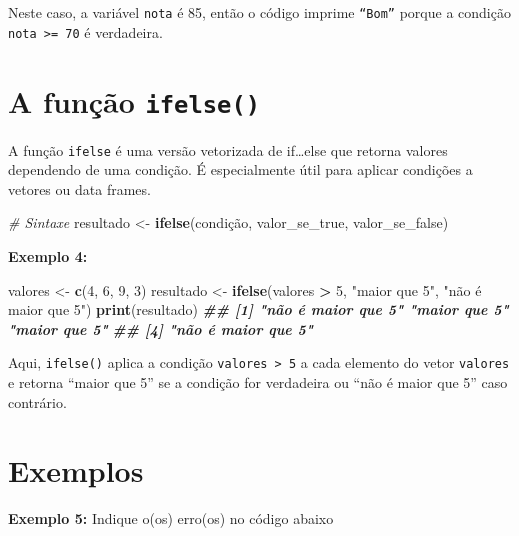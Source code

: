 \documentclass[
]{book}
\newenvironment{Shaded}{\begin{snugshade}}{\end{snugshade}}
\newcommand{\CommentTok}[1]{\textcolor[rgb]{0.56,0.35,0.01}{\textit{#1}}}
\newcommand{\DecValTok}[1]{\textcolor[rgb]{0.00,0.00,0.81}{#1}}
\newcommand{\DocumentationTok}[1]{\textcolor[rgb]{0.56,0.35,0.01}{\textbf{\textit{#1}}}}
\newcommand{\FunctionTok}[1]{\textcolor[rgb]{0.13,0.29,0.53}{\textbf{#1}}}
\newcommand{\NormalTok}[1]{#1}
\newcommand{\OtherTok}[1]{\textcolor[rgb]{0.56,0.35,0.01}{#1}}
\newcommand{\SpecialCharTok}[1]{\textcolor[rgb]{0.81,0.36,0.00}{\textbf{#1}}}
\newcommand{\StringTok}[1]{\textcolor[rgb]{0.31,0.60,0.02}{#1}}
\begin{document}
Neste caso, a variável \texttt{nota} é 85, então o código imprime \texttt{“Bom”}
porque a condição \texttt{nota\ \textgreater{}=\ 70} é verdadeira.

\section{\texorpdfstring{A função \texttt{ifelse()}}{A função ifelse()}}\label{a-funuxe7uxe3o-ifelse}

A função \texttt{ifelse} é uma versão vetorizada de if\ldots else que retorna
valores dependendo de uma condição. É especialmente útil para aplicar
condições a vetores ou data frames.

\begin{Shaded}
\begin{Highlighting}[]
\CommentTok{\# Sintaxe}
\NormalTok{resultado }\OtherTok{\textless{}{-}} \FunctionTok{ifelse}\NormalTok{(condição, valor\_se\_true, valor\_se\_false)}
\end{Highlighting}
\end{Shaded}

\textbf{Exemplo 4:}

\begin{Shaded}
\begin{Highlighting}[]
\NormalTok{valores }\OtherTok{\textless{}{-}} \FunctionTok{c}\NormalTok{(}\DecValTok{4}\NormalTok{, }\DecValTok{6}\NormalTok{, }\DecValTok{9}\NormalTok{, }\DecValTok{3}\NormalTok{)}
\NormalTok{resultado }\OtherTok{\textless{}{-}} \FunctionTok{ifelse}\NormalTok{(valores }\SpecialCharTok{\textgreater{}} \DecValTok{5}\NormalTok{, }\StringTok{"maior que 5"}\NormalTok{, }\StringTok{"não é maior que 5"}\NormalTok{)}
\FunctionTok{print}\NormalTok{(resultado)}
\DocumentationTok{\#\# [1] "não é maior que 5" "maior que 5"       "maior que 5"      }
\DocumentationTok{\#\# [4] "não é maior que 5"}
\end{Highlighting}
\end{Shaded}

Aqui, \texttt{ifelse()} aplica a condição \texttt{valores\ \textgreater{}\ 5} a cada elemento do
vetor \texttt{valores} e retorna ``maior que 5'' se a condição for verdadeira ou
``não é maior que 5'' caso contrário.

\section{Exemplos}\label{exemplos}

\textbf{Exemplo 5:} Indique o(os) erro(os) no código abaixo
\end{document}
